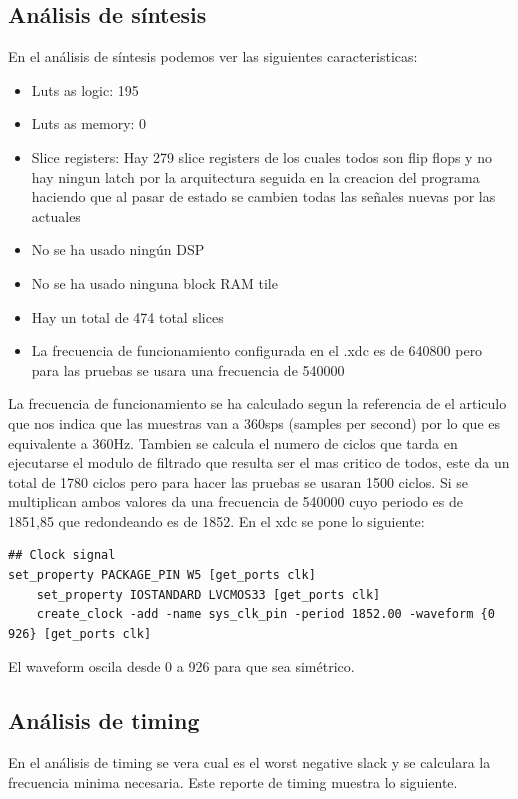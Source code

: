 \FloatBarrier

\subsection{Análisis de síntesis}

	En el análisis de síntesis podemos ver las siguientes caracteristicas:

	\begin{itemize}
		\item Luts as logic: 195
		\item Luts as memory: 0
		\item Slice registers: Hay 279 slice registers de los cuales todos son flip flops y no hay ningun latch por la arquitectura 
		seguida en la creacion del programa haciendo que al pasar de estado se cambien todas las señales nuevas por las actuales
		\item No se ha usado ningún DSP
		\item No se ha usado ninguna block RAM tile
		\item Hay un total de 474 total slices
		\item La frecuencia de funcionamiento configurada en el .xdc es de 640800 pero para las pruebas se usara una frecuencia de 540000
	\end{itemize}

	La frecuencia de funcionamiento se ha calculado segun la referencia de el articulo \cite{desai2021low} que nos indica que las muestras van a 360sps (samples per second) 
	por lo que es equivalente a 360Hz. Tambien se calcula el numero de ciclos que tarda en ejecutarse el modulo de filtrado que resulta ser el mas critico 
	de todos, este da un total de 1780 ciclos pero para hacer las pruebas se usaran 1500 ciclos. Si se multiplican ambos valores da una frecuencia de 540000 
	cuyo periodo es de 1851,85 que redondeando es de 1852. En el xdc se pone lo siguiente:

\lstset{language=VHDL, breaklines=true, basicstyle=\footnotesize}
\begin{lstlisting}[frame=single]
## Clock signal
set_property PACKAGE_PIN W5 [get_ports clk]							
	set_property IOSTANDARD LVCMOS33 [get_ports clk]
	create_clock -add -name sys_clk_pin -period 1852.00 -waveform {0 926} [get_ports clk]
\end{lstlisting}

El waveform oscila desde 0 a 926 para que sea simétrico.

\subsection{Análisis de timing}
	En el análisis de timing se vera cual es el worst negative slack y se calculara la frecuencia minima necesaria. Este reporte de timing muestra lo siguiente.

